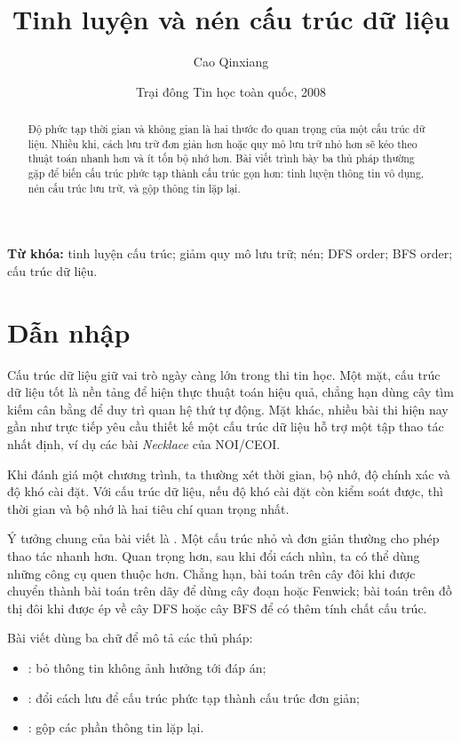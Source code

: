\documentclass[11pt]{article}
\title{Tinh luyện và nén cấu trúc dữ liệu}
\author{Cao Qinxiang}
\date{Trại đông Tin học toàn quốc, 2008}
\begin{document}
\maketitle


\renewcommand{\abstractname}{Tóm tắt}
\begin{abstract}
Độ phức tạp thời gian và không gian là hai thước đo quan trọng của một cấu
trúc dữ liệu. Nhiều khi, cách lưu trữ đơn giản hơn hoặc quy mô lưu trữ nhỏ hơn
sẽ kéo theo thuật toán nhanh hơn và ít tốn bộ nhớ hơn. Bài viết trình bày ba
thủ pháp thường gặp để biến cấu trúc phức tạp thành cấu trúc gọn hơn: tinh
luyện thông tin vô dụng, nén cấu trúc lưu trữ, và gộp thông tin lặp lại.
\end{abstract}

\noindent\textbf{Từ khóa:} tinh luyện cấu trúc; giảm quy mô lưu trữ; nén;
DFS order; BFS order; cấu trúc dữ liệu.

\section{Dẫn nhập}

Cấu trúc dữ liệu giữ vai trò ngày càng lớn trong thi tin học. Một mặt, cấu
trúc dữ liệu tốt là nền tảng để hiện thực thuật toán hiệu quả, chẳng hạn dùng
cây tìm kiếm cân bằng để duy trì quan hệ thứ tự động. Mặt khác, nhiều bài thi
hiện nay gần như trực tiếp yêu cầu thiết kế một cấu trúc dữ liệu hỗ trợ một
tập thao tác nhất định, ví dụ các bài \textit{Necklace} của NOI/CEOI.

Khi đánh giá một chương trình, ta thường xét thời gian, bộ nhớ, độ chính xác
và độ khó cài đặt. Với cấu trúc dữ liệu, nếu độ khó cài đặt còn kiểm soát
được, thì thời gian và bộ nhớ là hai tiêu chí quan trọng nhất.

Ý tưởng chung của bài viết là . Một cấu trúc nhỏ và
đơn giản thường cho phép thao tác nhanh hơn. Quan trọng hơn, sau khi đổi cách
nhìn, ta có thể dùng những công cụ quen thuộc hơn. Chẳng hạn, bài toán trên
cây đôi khi được chuyển thành bài toán trên dãy để dùng cây đoạn hoặc Fenwick;
bài toán trên đồ thị đôi khi được ép về cây DFS hoặc cây BFS để có thêm tính
chất cấu trúc.

Bài viết dùng ba chữ để mô tả các thủ pháp:
\begin{itemize}
  \item {}: bỏ thông tin không ảnh hưởng tới đáp án;
  \item {}: đổi cách lưu để cấu trúc phức tạp thành cấu trúc đơn giản;
  \item {}: gộp các phần thông tin lặp lại.
\end{itemize}
\end{document}
